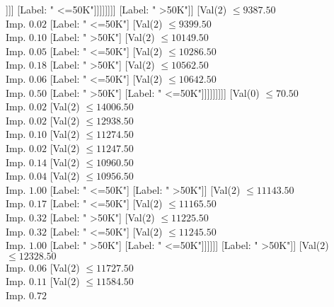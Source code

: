 \documentclass[margin=10pt]{standalone}
\begin{document}
\begin{forest}
																							[Label: " <=50K"]
																							[Label: " >50K"]]]]
																				[Label: " <=50K"]]]]]]]]
													[Label: " >50K"]]
												[Val($2$) $ \leq 9387.50$ \\ Imp. $0.02$
													[Label: " <=50K"]
													[Val($2$) $ \leq 9399.50$ \\ Imp. $0.10$
														[Label: " >50K"]
														[Val($2$) $ \leq 10149.50$ \\ Imp. $0.05$
															[Label: " <=50K"]
															[Val($2$) $ \leq 10286.50$ \\ Imp. $0.18$
																[Label: " >50K"]
																[Val($2$) $ \leq 10562.50$ \\ Imp. $0.06$
																	[Label: " <=50K"]
																	[Val($2$) $ \leq 10642.50$ \\ Imp. $0.50$
																		[Label: " >50K"]
																		[Label: " <=50K"]]]]]]]]]
										[Val($0$) $ \leq 70.50$ \\ Imp. $0.02$
											[Val($2$) $ \leq 14006.50$ \\ Imp. $0.02$
												[Val($2$) $ \leq 12938.50$ \\ Imp. $0.10$
													[Val($2$) $ \leq 11274.50$ \\ Imp. $0.02$
														[Val($2$) $ \leq 11247.50$ \\ Imp. $0.14$
															[Val($2$) $ \leq 10960.50$ \\ Imp. $0.04$
																[Val($2$) $ \leq 10956.50$ \\ Imp. $1.00$
																	[Label: " <=50K"]
																	[Label: " >50K"]]
																[Val($2$) $ \leq 11143.50$ \\ Imp. $0.17$
																	[Label: " <=50K"]
																	[Val($2$) $ \leq 11165.50$ \\ Imp. $0.32$
																		[Label: " >50K"]
																		[Val($2$) $ \leq 11225.50$ \\ Imp. $0.32$
																			[Label: " <=50K"]
																			[Val($2$) $ \leq 11245.50$ \\ Imp. $1.00$
																				[Label: " >50K"]
																				[Label: " <=50K"]]]]]]
															[Label: " >50K"]]
														[Val($2$) $ \leq 12328.50$ \\ Imp. $0.06$
															[Val($2$) $ \leq 11727.50$ \\ Imp. $0.11$
																[Val($2$) $ \leq 11584.50$ \\ Imp. $0.72$

\end{forest}
\end{document}
